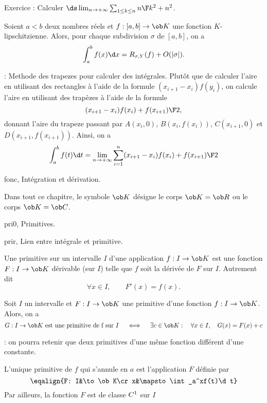 Exercice :  Calculer $\ds\lim_{n\to+\infty}\sum_{1\le k\le n}{n\F k^2+n^2}$. 

\Propriete []  Soient $a<b$ deux nombres r\'eels et $f:[a,b]\to\ob K$ une fonction $K$-lipschitzienne. Alors, pour chaque subdivision $\sigma$ de $[a,b]$, on a 
$$
\int_a^bf(x)\d x=R_{\sigma,Y}(f)+O(|\sigma|).
$$

\Remarque : Methode des trapezes pour calculer des int\'egrales. Plut\^ot que de calculer l'aire en utilisant des rectangles \`a l'aide de la formule $(x_{i+1}-x_i)f(y_i)$, on calcule l'aire en utilisant des trap\`ezes \`a l'aide de la formule 
$$
(x_{i+1}-x_i){f(x_i)+f(x_{i+1})\F 2}, 
$$
donnant l'aire du trapeze passant par $A(x_i,0)$, $B(x_i,f(x_i))$, $C(x_{i+1},0)$ et $D(x_{i+1},f(x_{i+1}))$. 
Ainsi, on a 
$$
\int_a^bf(t)\d t=\lim_{n\to+\infty}\sum_{i=1}^n(x_{i+1}-x_i){f(x_i)+f(x_{i+1})\F 2}
$$







\pagetitretrue


\Chapter fonc, Int\'egration et d\'erivation. 
\bigskip

\noindent
Dans tout ce chapitre, le symbole $\ob K$ d\'esigne le corps $\ob K=\ob R$ ou le corps $\ob K=\ob C$. 
\bigskip

\Section pri0, Primitives. 

\Subsection prir, Lien entre int\'egrale et primitive. 


\Definition []  Une primitive sur un intervalle $I$ d'une application $f:I\to\ob K$ est une fonction $F:I\to\ob K$ d\'erivable (sur $I$) telle que $f$ soit la d\'eriv\'ee de $F$ sur $I$. Autrement dit 
$$
\forall x\in I, \qquad F'(x)=f(x). 
$$

\Propriete []  Soit $I$ un intervalle et $F:I\to\ob K$ une primitive d'une fonction $f:I\to\ob K$. 
Alors, on a 
$$
G:I\to\ob K\mbox{ est une primitive de f sur }I\quad\ \Longleftrightarrow\quad\  \exists c\in\ob K : \quad \forall x\in I, \quad G(x)=F(x)+c
$$

\Remarque : on pourra retenir que deux primitives d'une m\^eme fonction diff\'erent d'une constante. 
\bigskip

\Theoreme [Title=Th\'eor\`eme fondamental de l'analyse;$f:I\to\ob K$ continue sur un intervalle $I$, $a\in I$] 
L'unique primitive de $f$ qui s'annule en $a$ est l'application $F$ d\'efinie par 
$$
\eqalign{F: I&\to\ob K\cr x&\mapsto  \int_a^xf(t)\d t}
$$
Par ailleurs, la fonction $F$ est de classe $\sc C^1$ sur $I$


